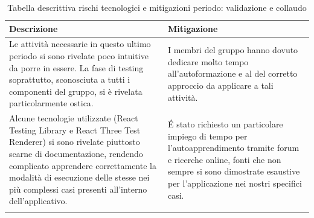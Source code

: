\begin{center}
    \begin{xltabular}{\textwidth}{| X | X |}
                
        \textbf{\color{white} Descrizione} & \textbf{\color{white} Mitigazione}\\ 
        \endhead
    
        Le attività necessarie in questo ultimo periodo si sono rivelate poco intuitive da porre in essere. La fase di testing soprattutto, sconosciuta a tutti i componenti del gruppo, si è rivelata particolarmente ostica. &
        I membri del gruppo hanno dovuto dedicare molto tempo all'autoformazione e al del corretto approccio da applicare a tali attività. \\
        \hline

        Alcune tecnologie utilizzate (React Testing Library e React Three Test Renderer) si sono rivelate piuttosto scarne di documentazione, rendendo complicato apprendere correttamente la modalità di esecuzione delle stesse nei più complessi casi presenti all'interno dell'applicativo. &
        É stato richiesto un particolare impiego di tempo per l'autoapprendimento tramite forum e ricerche online, fonti che non sempre si sono dimostrate esaustive per l'applicazione nei nostri specifici casi. \\
        \hline
            
        \caption{Tabella descrittiva rischi tecnologici e mitigazioni periodo: validazione e collaudo}\label{tab:rischi_tecnologici_poc}
    \end{xltabular}
\end{center}







\newpage


\newpage
\newpage
